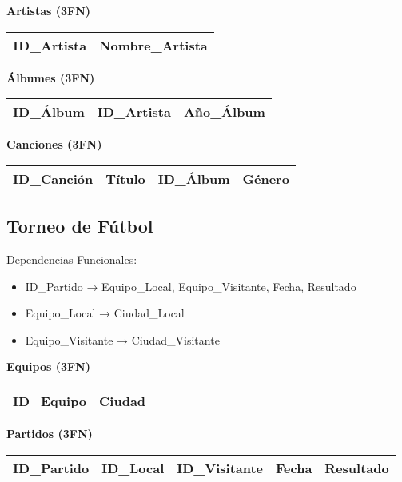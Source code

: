 \documentclass[12pt]{article}
\begin{document}
\textbf{Artistas (3FN)}
\begin{center}
\begin{tabular}{|l|l|}
\hline
ID\_Artista & Nombre\_Artista \\
\hline
\end{tabular}
\end{center}

\textbf{Álbumes (3FN)}
\begin{center}
\begin{tabular}{|l|l|l|}
\hline
ID\_Álbum & ID\_Artista & Año\_Álbum \\
\hline
\end{tabular}
\end{center}

\textbf{Canciones (3FN)}
\begin{center}
\begin{tabular}{|l|l|l|l|}
\hline
ID\_Canción & Título & ID\_Álbum & Género \\
\hline
\end{tabular}
\end{center}

\subsection{Torneo de Fútbol}

Dependencias Funcionales:
\begin{itemize}
    \item ID\_Partido → Equipo\_Local, Equipo\_Visitante, Fecha, Resultado
    \item Equipo\_Local → Ciudad\_Local
    \item Equipo\_Visitante → Ciudad\_Visitante
\end{itemize}

\textbf{Equipos (3FN)}
\begin{center}
\begin{tabular}{|l|l|}
\hline
ID\_Equipo & Ciudad \\
\hline
\end{tabular}
\end{center}

\textbf{Partidos (3FN)}
\begin{center}
\begin{tabular}{|l|l|l|l|l|}
\hline
ID\_Partido & ID\_Local & ID\_Visitante & Fecha & Resultado \\
\hline
\end{tabular}
\end{center}
\end{document}
